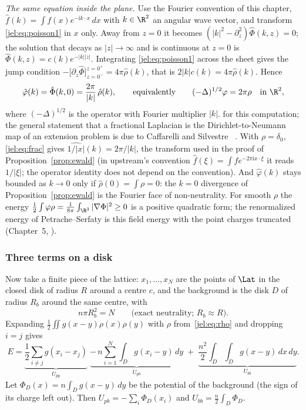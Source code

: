 \emph{The same equation inside the plane.} Use the Fourier convention of this chapter,
$\hat f(k)=\int f(x)e^{-\mathrm ik\cdot x}\,dx$ with $k\in\R^2$ an angular wave vector, and transform
\eqref{jel:eq:poisson1} in $x$ only. Away from $z=0$ it becomes $(|k|^2-\partial_z^2)\hat\Phi(k,z)=0$; the solution
that decays as $|z|\to\infty$ and is continuous at $z=0$ is $\hat\Phi(k,z)=c(k)e^{-|k||z|}$. Integrating
\eqref{jel:eq:poisson1} across the sheet gives the jump condition
$-\bigl[\partial_z\hat\Phi\bigr]_{z=0^-}^{z=0^+}=4\pi\hat\rho(k)$, that is $2|k|c(k)=4\pi\hat\rho(k)$. Hence
\begin{equation}\label{jel:eq:frac}
\hat\varphi(k)=\hat\Phi(k,0)=\frac{2\pi}{|k|}\,\hat\rho(k),\qquad\text{equivalently}\qquad
(-\Delta)^{1/2}\varphi=2\pi\rho\quad\text{in }\R^2,
\end{equation}
where $(-\Delta)^{1/2}$ is the operator with Fourier multiplier $|k|$. \tierC{} for this computation; the general
statement that a fractional Laplacian is the Dirichlet-to-Neumann map of an extension problem is due to Caffarelli and
Silvestre~\cite{caffsilv} \tierL. With $\rho=\delta_0$, \eqref{jel:eq:frac} gives $\widehat{1/|x|}(k)=2\pi/|k|$, the
transform used in the proof of Proposition~\ref{prop:ewald} (in upstream's convention
$\hat f(\xi)=\int fe^{-2\pi\mathrm ix\cdot\xi}$ it reads $1/|\xi|$; the operator identity does not depend on the
convention). And $\hat\varphi(k)$ stays bounded as $k\to0$ only if $\hat\rho(0)=\int\rho=0$: the $k=0$ divergence of
Proposition~\ref{prop:ewald} is the Fourier face of non-neutrality. For smooth $\rho$ the energy
$\frac12\int\varphi\rho=\frac1{8\pi}\int_{\R^3}|\nabla\Phi|^2\ge0$ is a positive quadratic form; the renormalized energy
of Petrache--Serfaty is this field energy with the point charges truncated (Chapter~5, \tierL).

\subsubsection{Three terms on a disk}\label{jel:three}

Now take a finite piece of the lattice: $x_1,\dots,x_N$ are the points of $\Lat$ in the closed disk of radius $R$
around a centre $c$, and the background is the disk $D$ of radius $R_b$ around the same centre, with
\begin{equation}\label{jel:eq:Rb}
n\pi R_b^2=N\qquad\text{(exact neutrality; $R_b\approx R$).}
\end{equation}
Expanding $\frac12\iint g(x-y)\rho(x)\rho(y)$ with $\rho$ from~\eqref{jel:eq:rho} and dropping $i=j$ gives
\begin{equation}\label{jel:eq:three}
E=\underbrace{\frac12\sum_{i\ne j}g(x_i-x_j)}_{U_{pp}}
\;\underbrace{-\,n\sum_{i=1}^N\int_Dg(x_i-y)\,dy}_{U_{pb}}
\;+\;\underbrace{\frac{n^2}2\int_D\!\!\int_Dg(x-y)\,dx\,dy}_{U_{bb}} .
\end{equation}
Let $\Phi_D(x)=n\int_Dg(x-y)\,dy$ be the potential of the background (the sign of its charge left out). Then
$U_{pb}=-\sum_i\Phi_D(x_i)$ and $U_{bb}=\frac n2\int_D\Phi_D$.

